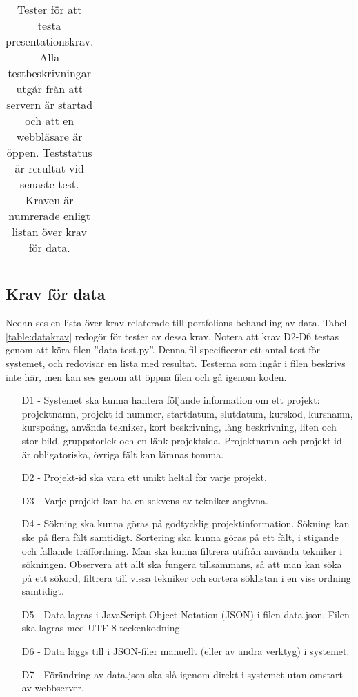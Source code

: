 \documentclass{TDP003mall}
\begin{document}
\begin{landscape}
{\begin{table}[!h]
\begin{tabularx}{\linewidth}{|l|X|X|X|l|}
    \end{tabularx}
    \caption{Tester för att testa presentationskrav. Alla testbeskrivningar utgår från att servern är startad och att en webbläsare är öppen. Teststatus är resultat vid senaste test. Kraven är numrerade enligt listan över krav för data.}
    \label{table:presentationskrav2}
  \end{table}
  }
  
\end{landscape}


\subsection{Krav för data}

Nedan ses en lista över krav relaterade till portfolions behandling av data. Tabell \ref{table:datakrav} redogör för tester av dessa krav. Notera att krav D2-D6 testas genom att köra filen ''data-test.py''. Denna fil specificerar ett antal test för systemet, och redovisar en lista med resultat. Testerna som ingår i filen beskrivs inte här, men kan ses genom att öppna filen och gå igenom koden. 

\begin{enumerate}
\item[D1 - ] Systemet ska kunna hantera följande information om ett projekt: projektnamn, projekt-id-nummer, startdatum, slutdatum, kurskod, kursnamn, kurspoäng, använda tekniker, kort beskrivning, lång beskrivning, liten och stor bild, gruppstorlek och en länk projektsida. Projektnamn och projekt-id är obligatoriska, övriga fält kan lämnas tomma.
\item[D2 - ] Projekt-id ska vara ett unikt heltal för varje projekt.
\item[D3 - ] Varje projekt kan ha en sekvens av tekniker angivna.
\item[D4 - ] Sökning ska kunna göras på godtycklig projektinformation. Sökning kan ske på flera fält samtidigt. Sortering ska kunna göras på ett fält, i stigande och fallande träffordning. Man ska kunna filtrera utifrån använda tekniker i sökningen. Observera att allt ska fungera tillsammans, så att man kan söka på ett sökord, filtrera till vissa tekniker och sortera söklistan i en viss ordning samtidigt.
\item[D5 - ] Data lagras i JavaScript Object Notation (JSON) i filen data.json. Filen ska lagras med UTF-8 teckenkodning.
\item[D6 - ] Data läggs till i JSON-filer manuellt (eller av andra verktyg) i systemet.
\item[D7 - ] Förändring av data.json ska slå igenom direkt i systemet utan omstart av webbserver.
\end{enumerate}
\end{document}
